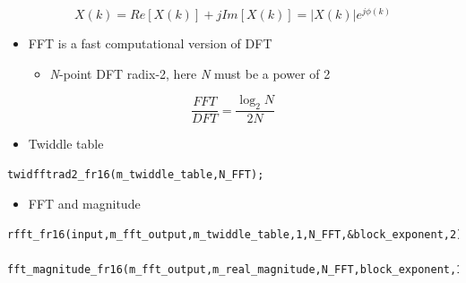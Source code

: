 \begin{equation}
X(k)=Re[X(k)]+jIm[X(k)]=|X(k)|e^{j\phi(k)}
\end{equation}

\begin{itemize}
	\item FFT is a fast computational version of DFT
	\begin{itemize}
		\item \textit{N}-point DFT radix-2, here \textit{N} must be a power of 2 
	\end{itemize}
\end{itemize}

\begin{equation}
\dfrac{FFT}{DFT}=\dfrac{\log_2N}{2N}
\end{equation}

\begin{itemize}
	\item Twiddle table
\end{itemize}

\begin{verbatim}
twidfftrad2_fr16(m_twiddle_table,N_FFT);
\end{verbatim}

\begin{itemize}
	\item FFT and magnitude
\end{itemize}

\begin{verbatim}
rfft_fr16(input,m_fft_output,m_twiddle_table,1,N_FFT,&block_exponent,2);

fft_magnitude_fr16(m_fft_output,m_real_magnitude,N_FFT,block_exponent,1);
\end{verbatim}


